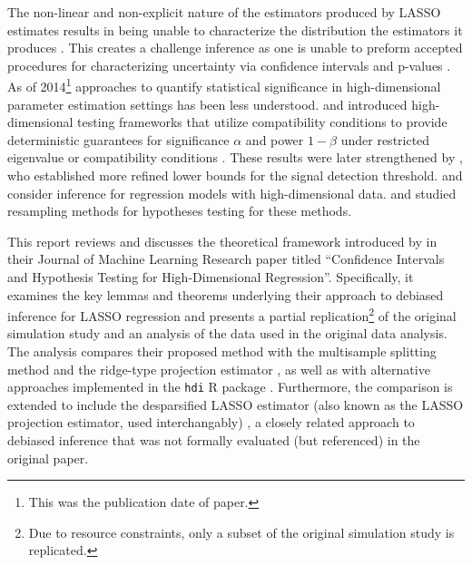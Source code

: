 \documentclass{article}
\begin{document}
The non-linear and non-explicit nature of the estimators produced by LASSO estimates results in being unable to characterize the distribution the estimators it produces \citep{Fu_Knight_2000}. This creates a challenge inference as one is unable to preform accepted procedures for characterizing uncertainty via confidence intervals and p-values \citep{wasserman2004all, lehmann2005testing}. As of 2014\footnote{This was the publication date of \citet{javanmard14a} paper.} approaches to quantify statistical significance in high-dimensional parameter estimation settings has been less understood. \citet{Buhlman2013} and \citet{zhang2014confidence} introduced high-dimensional testing frameworks that utilize compatibility conditions to provide deterministic guarantees for significance $\alpha$ and power $1-\beta$ under restricted eigenvalue or compatibility conditions \citep{buhlmann2011statistics}. These results were later strengthened by \citet{javanmard_nips2013}, who established more refined lower bounds for the signal detection threshold.  \citet{Belloni_2013} and  \citet{Belloni_Chernozhukov_Hansen_2014} consider inference for regression models with high-dimensional data. \citet{Meinshausen_2010} and \cite{Minnier_Tian_Cai_2011} studied resampling methods for hypotheses testing for these methods. 

This report reviews and discusses the theoretical framework introduced by \citet{javanmard14a} in their Journal of Machine Learning Research paper titled ``Confidence Intervals and Hypothesis Testing for High-Dimensional Regression''. Specifically, it examines the key lemmas and theorems underlying their approach to debiased inference for LASSO regression and presents a partial replication\footnote{Due to resource constraints, only a subset of the original simulation study is replicated.} of the original simulation study and an analysis of the data used in the original data analysis. The analysis compares their proposed method with the multisample splitting method \citep{Meinshausen_Buhlman_2009, meinshausen2010stability} and the ridge-type projection estimator \citep{Buhlman2013}, as well as with alternative approaches implemented in the \texttt{hdi} R package \citep{hdi_pkg2015}. Furthermore, the comparison is extended to include the desparsified LASSO  estimator (also known as the LASSO projection estimator, used interchangably) \citep{vandegeer2014asymptotically, zhang2014confidence, buhlmann2015misspecified}, a closely related approach to debiased inference that was not formally evaluated (but referenced) in the original paper.
\end{document}
